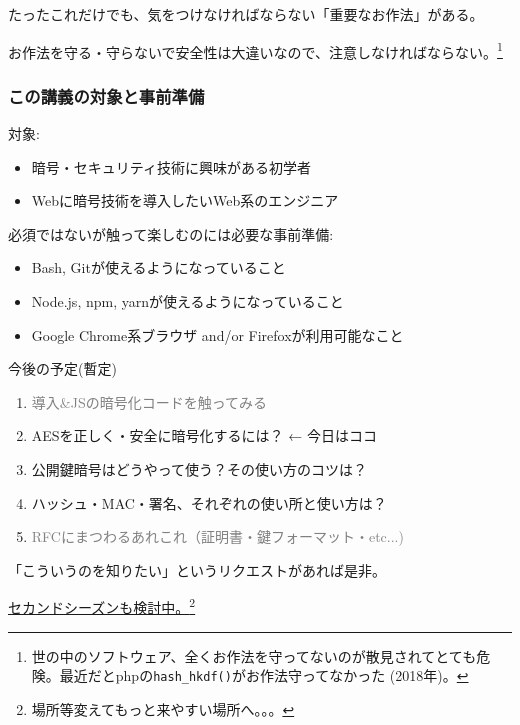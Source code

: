 \documentclass[12pt,dvipdfmx]{beamer}
\begin{document}
\begin{frame}

たったこれだけでも、気をつけなければならない\alert{「重要なお作法」}がある。

\vspace{2ex}

\alert{お作法を守る・守らないで安全性は大違い}なので、注意しなければならない。\footnote[frame]{世の中のソフトウェア、全くお作法を守ってないのが散見されてとても危険。最近だとphpの\texttt{hash\_hkdf()}がお作法守ってなかった (2018年)。}
\end{frame}



\begin{frame}
\frametitle{この講義の対象と事前準備}
対象:
\begin{itemize}
\item 暗号・セキュリティ技術に興味がある初学者
\item Webに暗号技術を導入したいWeb系のエンジニア
\end{itemize}

\vspace{2ex}

必須ではないが触って楽しむのには必要な事前準備:
\begin{itemize}
\item Bash, Gitが使えるようになっていること
\item Node.js, npm, yarnが使えるようになっていること
\item Google Chrome系ブラウザ and/or Firefoxが利用可能なこと
\end{itemize}
\end{frame}


\begin{frame}
今後の予定(暫定)
\begin{enumerate}
 \item \textcolor{gray}{導入\&JSの暗号化コードを触ってみる}
 \item \alert{AESを正しく・安全に暗号化するには？} ← 今日はココ
 \item 公開鍵暗号はどうやって使う？その使い方のコツは？
 \item ハッシュ・MAC・署名、それぞれの使い所と使い方は？
 \item \textcolor{gray}{RFCにまつわるあれこれ（証明書・鍵フォーマット・etc...)}
\end{enumerate}
「こういうのを知りたい」というリクエストがあれば是非。

\vspace{2ex}

\underline{セカンドシーズンも検討中。}\footnote[frame]{場所等変えてもっと来やすい場所へ。。。}
\end{frame}
\end{document}
